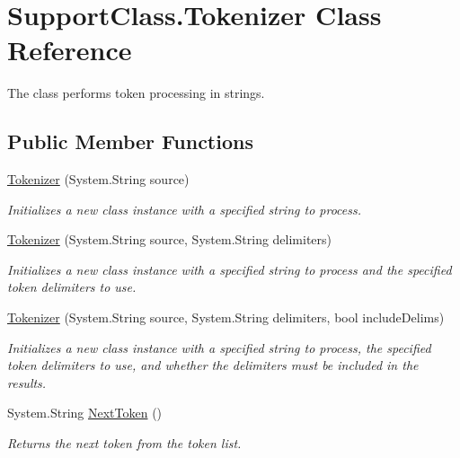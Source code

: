 \hypertarget{class_support_class_1_1_tokenizer}{
\section{SupportClass.Tokenizer Class Reference}
\label{class_support_class_1_1_tokenizer}
}


The class performs token processing in strings.  


\subsection*{Public Member Functions}
\begin{DoxyCompactItemize}
\item 
\hyperlink{class_support_class_1_1_tokenizer_a3c422c6eda6d1fca237779192c714457}{Tokenizer} (System.String source)
\begin{DoxyCompactList}\small\item\em Initializes a new class instance with a specified string to process. \item\end{DoxyCompactList}\item 
\hyperlink{class_support_class_1_1_tokenizer_a6322ebacf4bd423c704d2ea3bd1adad7}{Tokenizer} (System.String source, System.String delimiters)
\begin{DoxyCompactList}\small\item\em Initializes a new class instance with a specified string to process and the specified token delimiters to use. \item\end{DoxyCompactList}\item 
\hyperlink{class_support_class_1_1_tokenizer_aba0d507d83decbe4ed671339622157bf}{Tokenizer} (System.String source, System.String delimiters, bool includeDelims)
\begin{DoxyCompactList}\small\item\em Initializes a new class instance with a specified string to process, the specified token delimiters to use, and whether the delimiters must be included in the results. \item\end{DoxyCompactList}\item 
System.String \hyperlink{class_support_class_1_1_tokenizer_aa8b05db74347979775f1f928b2e67fda}{NextToken} ()
\begin{DoxyCompactList}\small\item\em Returns the next token from the token list. \item\end{DoxyCompactList}\item 

\end{DoxyCompactItemize}
